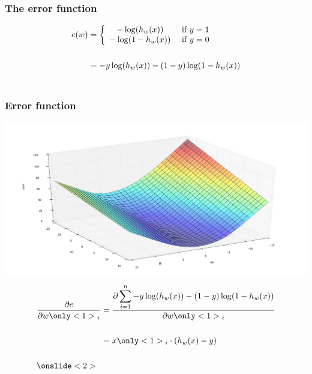   \begin{frame}
    \frametitle{The error function}
    \begin{center}
      \begin{equation*}
        \begin{split}
          e(w) & =
          \left \{
            \begin{array}{cl}
              -\log(h_w(x)) & $ if $ y = 1\\
              -\log(1 - h_w(x)) & $ if $ y = 0
            \end{array}
            \right.\\~\\
            & = -y \log(h_w(x)) - (1 - y) \log(1 - h_w(x))\\~\\
          \end{split}
        \end{equation*}
      \end{center}
    \end{frame}

    \begin{frame}
      \frametitle{Error function}
      \begin{center}
        \includegraphics[scale=0.22]{./pictures/error_function.png}
      \end{center}
    \end{frame}

    \begin{frame}
      \begin{equation*}
        \begin{split}
          \frac{\partial e}{\partial w\only<1>{_i}} & = \frac{\partial \displaystyle\sum_{i =
        1}^n{-y \log(h_w(x)) - (1 - y) \log(1 -
      h_w(x)})}{\partial w\only<1>{_i}} \\~\\
      & = x\only<1>{_i} \cdot (h_w(x) - y)\\~\\
      \onslide<2>{~}
\end{split}
  \end{equation*}
\end{frame}

